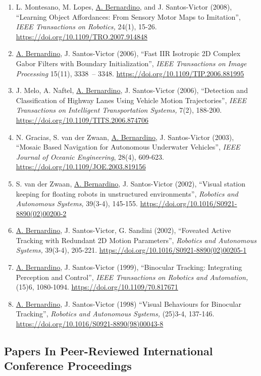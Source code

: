 \begin{enumerate}
{  Recognition Letters,} 30(1), 18-26.
  \url{https://doi.org/10.1016/j.patrec.2008.08.012}
\item
  L. Montesano, M. Lopes, \ul{A. Bernardino}, and J. Santos-Victor
  (2008), ``Learning Object Affordances: From Sensory Motor Maps to
  Imitation'', \emph{IEEE Transactions on Robotics,} 24(1), 15-26.
  \url{https://doi.org/10.1109/TRO.2007.914848}
\item
  \ul{A. Bernardino}, J. Santos-Victor (2006), ``Fast IIR Isotropic 2D
  Complex Gabor Filters with Boundary Initialization'', \emph{IEEE
  Transactions on Image Processing} 15(11), 3338~-- 3348.
  \url{https://doi.org/10.1109/TIP.2006.881995}
\item
  J. Melo, A. Naftel, \ul{A. Bernardino}, J. Santos-Victor (2006),
  ``Detection and Classification of Highway Lanes Using Vehicle Motion
  Trajectories'', \emph{IEEE Transactions on Intelligent Transportation
  Systems,} 7(2), 188-200.
  \url{https://doi.org/10.1109/TITS.2006.874706}
\item
  N. Gracias, S. van der Zwaan, \ul{A. Bernardino}, J. Santos-Victor
  (2003), ``Mosaic Based Navigation for Autonomous Underwater
  Vehicles'', \emph{IEEE Journal of Oceanic Engineering}, 28(4),
  609-623. \url{https://doi.org/10.1109/JOE.2003.819156}
\item
  S. van der Zwaan, \ul{A. Bernardino}, J. Santos-Victor (2002),
  ``Visual station keeping for floating robots in unstructured
  environments'', \emph{Robotics and Autonomous Systems,} 39(3-4),
  145-155. \url{https://doi.org/10.1016/S0921-8890(02)00200-2}
\item
  \ul{A. Bernardino}, J. Santos-Victor, G. Sandini (2002), ``Foveated
  Active Tracking with Redundant 2D Motion Parameters'', \emph{Robotics
  and Autonomous Systems,} 39(3-4), 205-221.
  \url{https://doi.org/10.1016/S0921-8890(02)00205-1}
\item
  \ul{A. Bernardino}, J. Santos-Victor (1999), ``Binocular Tracking:
  Integrating Perception and Control'', \emph{IEEE Transactions on
  Robotics and Automation,} (15)6, 1080-1094.
  \url{https://doi.org/10.1109/70.817671}
\item
  \ul{A. Bernardino}, J. Santos-Victor (1998) ``Visual Behaviours for
  Binocular Tracking'', \emph{Robotics and Autonomous Systems,} (25)3-4,
  137-146. \url{https://doi.org/10.1016/S0921-8890(98)00043-8}
\end{enumerate}

\subsection{Papers In Peer-Reviewed International Conference
Proceedings}\label{papers-in-peer-reviewed-international-conference-proceedings}

